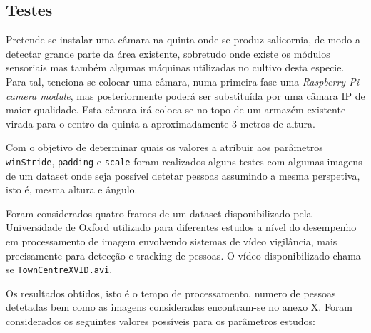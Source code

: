 
















\subsection{Testes}

Pretende-se instalar uma câmara na quinta onde se produz salicornia, de modo a detectar grande parte da área existente, sobretudo onde existe os módulos sensoriais mas também algumas máquinas utilizadas no cultivo desta especie. Para tal, tenciona-se colocar uma câmara, numa primeira fase uma \textit{Raspberry Pi camera module}, mas posteriormente poderá ser substituída por uma câmara IP de maior qualidade. Esta câmara irá coloca-se no topo de um armazém existente virada para o centro da quinta a aproximadamente 3 metros de altura. 

Com o objetivo de determinar quais os valores a atribuir aos parâmetros \texttt{winStride}, \texttt{padding} e \texttt{scale} foram realizados alguns testes com algumas imagens de um dataset onde seja possível detetar pessoas assumindo a mesma perspetiva, isto é, mesma altura e ângulo.  

Foram considerados quatro frames de um dataset disponibilizado pela Universidade de Oxford utilizado para diferentes estudos a nível do desempenho em processamento de imagem envolvendo sistemas de vídeo vigilância, mais precisamente para detecção e tracking de pessoas\cite{imagProccdata}. O vídeo disponibilizado chama-se \texttt{TownCentreXVID.avi}. 

Os resultados obtidos, isto é o tempo de processamento, numero de pessoas detetadas bem como as imagens consideradas encontram-se no anexo X. Foram considerados os seguintes valores possíveis para os parâmetros estudos: 

